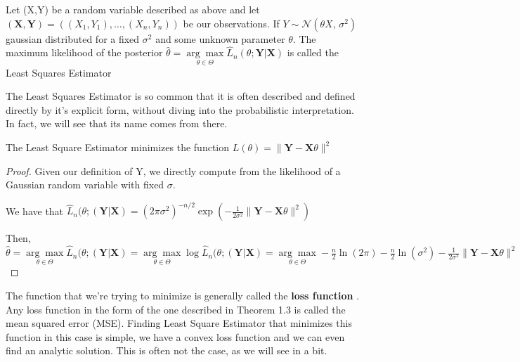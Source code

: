 \begin{definition}
Let (X,Y) be a random variable described as above and let 
$(\mathbf{X},\mathbf{Y})=\left((X_{1},Y_{1}), \ldots, (X_{n},Y_{n})\right)$ be our observations. If $Y \sim \mathcal{N}(\theta X,\,\sigma^{2})\  $ gaussian distributed for a fixed $\sigma^{2}$ and some unknown parameter $\theta$. The maximum likelihood of the posterior $\hat{\theta}=\underset{\theta \in \Theta}{\arg \max } \widehat{L}_{n}(\theta ;\mathbf{Y}|\mathbf{X})$ is called the Least Squares Estimator

\end{definition}



The Least Squares Estimator is so common that it is often described and defined directly by it's explicit form, without diving into the probabilistic interpretation. In fact, we will see that its name comes from there.

\begin{theorem}
  The Least Square Estimator minimizes the function $L({\theta})=\|\mathbf{Y}-\mathbf{X} {\theta}\|^{2}$
\end{theorem}

\begin{proof}
  Given our definition of Y, we directly compute from the likelihood of a Gaussian random variable with fixed $\sigma$.
  
  We have that 
  $\widehat{L}_{n}(\theta ;(\mathbf{Y}|\mathbf{X})=\left(2 \pi \sigma^{2}\right)^{-n / 2} \exp \left(-\frac{1}{2 \sigma^{2}} \|\mathbf{Y}-\mathbf{X} {\theta}\|^{2}\right)$
  
  Then,
  $\hat{\theta}=\underset{\theta \in \Theta}{\arg \max } \widehat{L}_{n}(\theta ;(\mathbf{Y}|\mathbf{X})=\underset{\theta \in \Theta}{\arg \max } \log\widehat{L}_{n}(\theta ;(\mathbf{Y}|\mathbf{X})=\underset{\theta \in \Theta}{\arg \max }  -\frac{n}{2} \ln (2 \pi)-\frac{n}{2} \ln \left(\sigma^{2}\right)-\frac{1}{2 \sigma^{2}} \|\mathbf{Y}-\mathbf{X} {\theta}\|^{2}=\underset{\theta \in \Theta}{\arg \max } \widehat{L}_{n}(\theta ;(\mathbf{Y}|\mathbf{X})=\underset{\theta \in \Theta}{\arg \min }\|\mathbf{Y}-\mathbf{X} {\theta}\|^{2}$
\end{proof}



The function that we're trying to minimize is generally called the \textbf{loss function} . Any loss function in the form of the one described in Theorem 1.3 is called the mean squared error (MSE). Finding Least Square Estimator that minimizes this function in this case is simple, we have a convex loss function and we can even find an analytic solution. This is often not the case, as we will see in a bit.

